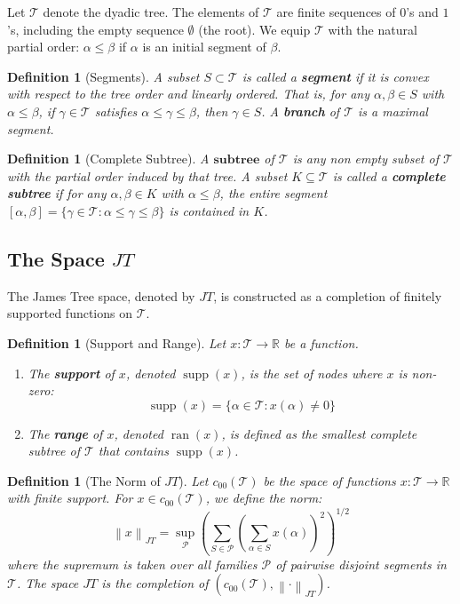\documentclass[11pt,a4paper]{amsart}
\newtheorem{definition}[theorem]{Definition}
\newcommand{\JT}{JT}
\newcommand{\Tree}{\mathcal{T}}
\newcommand{\norm}[1]{\left\lVert#1\right\rVert}
\newcommand{\supp}{\operatorname{supp}}
\newcommand{\ran}{\operatorname{ran}}
\begin{document}
Let $\Tree$ denote the dyadic tree. The elements of $\Tree$ are finite sequences of $0$'s and $1$'s, including the empty sequence $\emptyset$ (the root). We equip $\Tree$ with the natural partial order: $\alpha \le \beta$ if $\alpha$ is an initial segment of $\beta$.

\begin{definition}[Segments]
    A subset $S \subset \Tree$ is called a \textbf{segment} if it is convex with respect to the tree order and linearly ordered. That is, for any $\alpha, \beta \in S$ with $\alpha \le \beta$, if $\gamma \in \Tree$ satisfies $\alpha \le \gamma \le \beta$, then $\gamma \in S$. A \textbf{branch} of $\Tree$ is a maximal segment.
\end{definition}

\begin{definition}[Complete Subtree]
  A $\textbf{subtree}$ of $\Tree$ is any non empty subset of $\Tree$ with the partial order induced by that tree.  A subset $K \subseteq \Tree$ is called a \textbf{complete subtree} if for any $\alpha, \beta \in K$ with $\alpha \le \beta$, the entire segment $[\alpha, \beta] = \{ \gamma \in \Tree : \alpha \le \gamma \le \beta \}$ is contained in $K$.
\end{definition}

\subsection{The Space $\JT$}

The James Tree space, denoted by $\JT$, is constructed as a completion of finitely supported functions on $\Tree$.

\begin{definition}[Support and Range]
    Let $x: \Tree \to \mathbb{R}$ be a function.
    \begin{enumerate}
        \item The \textbf{support} of $x$, denoted $\supp(x)$, is the set of nodes where $x$ is non-zero:
        \[ \supp(x) = \{ \alpha \in \Tree : x(\alpha) \neq 0 \} \]
        \item The \textbf{range} of $x$, denoted $\ran(x)$, is defined as the smallest complete subtree of $\Tree$ that contains $\supp(x)$.
    \end{enumerate}
\end{definition}

\begin{definition}[The Norm of $\JT$]
    Let $c_{00}(\Tree)$ be the space of functions $x: \Tree \to \mathbb{R}$ with finite support. For $x \in c_{00}(\Tree)$, we define the norm:
    \begin{equation}
        \norm{x}_{\JT} = \sup_{\mathcal{P}} \left( \sum_{S \in \mathcal{P}} \left( \sum_{\alpha \in S} x(\alpha) \right)^2 \right)^{1/2}
    \end{equation}
    where the supremum is taken over all families $\mathcal{P}$ of pairwise disjoint segments in $\Tree$. The space $\JT$ is the completion of $(c_{00}(\Tree), \norm{\cdot}_{\JT})$.
\end{definition}
\end{document}
